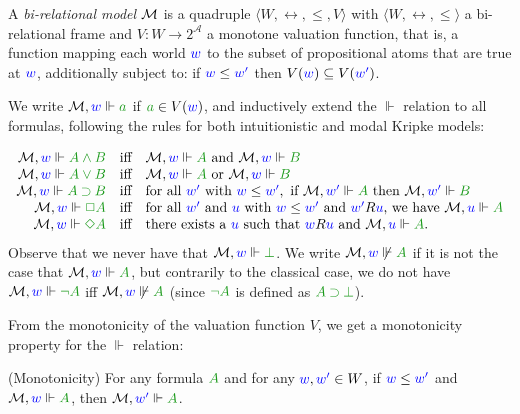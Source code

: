 \documentclass[a4paper]{article}
\begin{document}
 \begin{definition}
 	\label{model}
 	A \emph{bi-relational model} $\mathcal{M}$ is a quadruple $\langle W, \rel,\le,V \rangle$ with $\langle W, \rel, \le \rangle$ a bi-relational frame and $V\colon W \to 2^\mathcal{A}$ a monotone valuation function, that is, a function mapping each world ${\color{blue}{w}}$ to the subset of propositional atoms that are true at ${\color{blue}{w}}$, additionally subject to:
 	if ${\color{blue}{w}} \le {\color{blue}{w'}}$ then $V({\color{blue}{w}})\subseteq V({\color{blue}{w'}})$.
 \end{definition}
 
 We write $\M, \lb w \Vdash \fm a$ if $\fm a \in V(\lb w)$, and inductively extend the $\Vdash$ relation to all formulas, following the rules for both intuitionistic and modal Kripke models:
 
 \begin{equation}\label{eq:kripke}
 \begin{array}{rcl}
 \M, \lb w \Vdash \fm{A \AND B} & \mbox{iff} & \M, \lb w \Vdash \fm A \mbox{ and } \M, \lb w \Vdash \fm B\\
 
 \M, \lb w \Vdash \fm{A \OR B} & \mbox{iff} & \M, \lb w \Vdash \fm A \mbox{ or } \M, \lb w \Vdash \fm B\\
 
 \M, \lb w \Vdash \fm{A \IMP B} & \mbox{iff} & \mbox{for all } \lb{w'} \mbox{ with } \futs w{w'}, \mbox{ if } \M, \lb{w'} \Vdash \fm A \mbox{ then } \M, \lb{w'} \Vdash \fm B\\
 
 \M, \lb w \Vdash \fm{\BOX A} & \mbox{iff} & \mbox{for all } \lb{w'} \mbox{ and } \lb u \mbox{ with } \futs w{w'} \mbox{ and } \accs {w'}u \mbox{, we have } \M, \lb u \Vdash \fm A \hfill \\ %
 
 \M, \lb w \Vdash \fm{\DIA A} & \mbox{iff} & \mbox{there exists a } \lb u \mbox{ such that } \accs wu \mbox{ and } \M, \lb u \Vdash \fm A.
 
 \end{array}
 \end{equation}
 Observe that we never have that $\M, \lb w \Vdash \fm\bot$. 
 We write $\M, \lb w \not\Vdash \fm A$ if it is not the case that $\M, \lb w \Vdash \fm A$, but contrarily to the classical case, we do not have $\M, \lb w \Vdash \fm{\neg A}$ iff $\M, \lb w \not\Vdash \fm A$ (since $\fm{\neg A}$ is defined as $\fm{A \IMP \bot}$).
 
 From the monotonicity of the valuation function $V$, we get a monotonicity property for the $\Vdash$ relation:
 \begin{proposition}(Monotonicity) 
 	For any formula $\fm A$ and for any ${\color{blue}{w}}, {\color{blue}{w'}} \in W$, if ${\color{blue}{w}}\le{{\color{blue}{w'}}}$ and $\M, \lb w \Vdash \fm A$, then $\M, \lb{w'} \Vdash \fm A$.
 \end{proposition}
 
\end{document}
